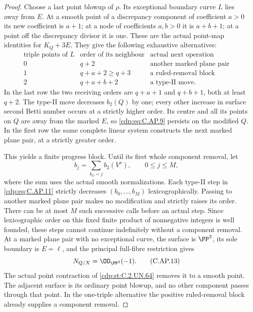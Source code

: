 \begin{proof}
Choose a last point blowup of \(\rho\). Its exceptional
boundary curve \(L\) lies away from \(E\). At a smooth point
of a discrepancy component of coefficient \(a>0\) its new
coefficient is \(a+1\); at a node of coefficients \(a,b>0\)
it is \(a+b+1\); at a point off the discrepancy divisor it
is one. These are the actual point-map identities for
\(K_Q+3E\). They give the following exhaustive alternatives:
\[
\begin{array}{c|c|c}
 \text{triple points of }L&\text{order of its neighbour}
                       &\text{actual next operation}\\ \hline
 0&q+2&\text{another marked plane pair}\\
 1&q+a+2\ge q+3&\text{a ruled-removal block}\\
 2&q+a+b+2&\text{a type-II move}.
\end{array}
 \tag{C.AP.11}\label{cdp:eq:C.AP.11}
\]
In the last row the two receiving orders are
\(q+a+1\) and \(q+b+1\), both at least \(q+2\). The type-II
move decreases \(b_2(Q)\) by one; every other increase in
surface second Betti number occurs at a strictly higher
order. Its centre and all its points on \(Q\) are away from
the marked \(E\), so \eqref{cdp:eq:C.AP.9} persists on the modified \(Q\).
In the first row the same complete linear system constructs
the next marked plane pair, at a strictly greater order.

This yields a finite progress block. Until its first whole
component removal, let
\[
                    b_j=\sum_{k_V=j}b_2(V^\nu),
                    \qquad 0\le j\le M,
 \tag{C.AP.12}\label{cdp:eq:C.AP.12}
\]
where the sum uses the actual smooth normalizations. Each
type-II step in \eqref{cdp:eq:C.AP.11} strictly decreases
\((b_0,\ldots,b_M)\) lexicographically. Passing to another
marked plane pair makes no modification and strictly raises
its order. There can be at most \(M\) such successive calls
before an actual step. Since lexicographic order on this
fixed finite product of nonnegative integers is well founded,
these steps cannot continue indefinitely without a component
removal. At a marked plane pair with no exceptional curve,
the surface is \(\PP^2\), its sole boundary is \(E=\ell\),
and the principal full-fibre restriction gives
\[
                 N_{Q/X}=\OO_{\PP^2}(-1).
 \tag{C.AP.13}\label{cdp:eq:C.AP.13}
\]
The actual point contraction of \ref{cdp:st:C.2.UN.64} removes it to a smooth
point. The adjacent surface is its ordinary point blowup,
and no other component passes through that point. In the
one-triple alternative the positive ruled-removal block
already supplies a component removal.


\end{proof}
